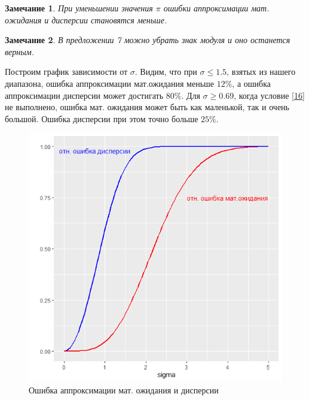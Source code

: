\documentclass[12pt]{article}
\newtheorem{zam}{Замечание}
\begin{document}
\begin{zam}
	При уменьшении значения $\pi$ ошибки аппроксимации мат. ожидания и дисперсии становятся меньше.
\end{zam}
\begin{zam}
	В предложении 7 можно убрать знак модуля и оно останется верным.
\end{zam}
	
	Построим график зависимости от $\sigma$. Видим, что при $\sigma\leq1.5$, взятых из нашего диапазона, ошибка аппроксимации мат.ожидания меньше $12\%$, а ошибка аппроксимации дисперсии может достигать $80\%$. Для $\sigma\geq 0.69$, когда условие \eqref{16} не выполнено, ошибка мат. ожидания может быть как маленькой, так и очень большой. Ошибка дисперсии при этом точно больше $25\%$.
	
	\begin{figure}[h]
		\begin{center}
			\begin{minipage}[h]{0.6\linewidth}
				\includegraphics[width=1\linewidth]{img/par_new2.jpg}
				\caption{Ошибка аппроксимации мат. ожидания и дисперсии} %
				\label{ris:image1} %
			\end{minipage}
			
		\end{center}
	\end{figure}
	
\end{document}
